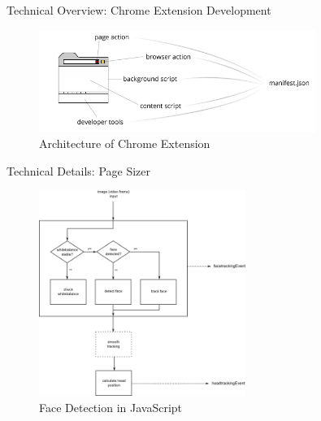\documentclass{beamer}
\begin{document}
\begin{frame}{Technical Overview: Chrome Extension Development}
    \begin{figure}
        \includegraphics[width=0.8\textwidth]{./images/architecture.png}
        \caption{Architecture of Chrome Extension}
    \end{figure}
\end{frame}

\begin{frame}{Technical Details: Page Sizer}
\begin{center}
    \begin{figure}
        \includegraphics[width=0.6\textwidth]{./images/face_detectin.png}
        \caption{Face Detection in JavaScript}
    \end{figure}
\end{center}
\end{frame}
\end{document}
